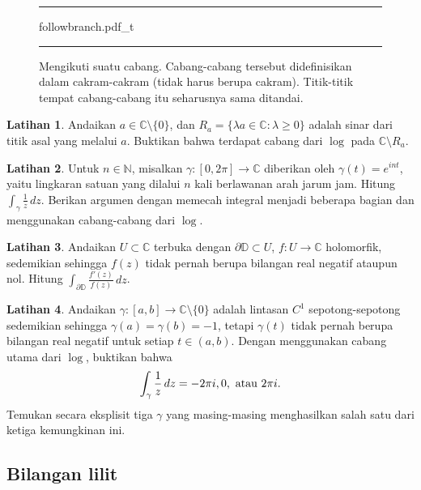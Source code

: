\documentclass[12pt,openany]{book}
\newcommand{\avoidbreak}{\postdisplaypenalty=100}
\newcommand{\C}{{\mathbb{C}}}
\newcommand{\N}{{\mathbb{N}}}
\newcommand{\D}{{\mathbb{D}}}
\theoremstyle{plain}
\theoremstyle{remark}
\theoremstyle{definition}
\newenvironment{exbox}{%
    \def\FrameCommand{\vrule width 1pt \relax\hspace{10pt}}%
    \MakeFramed{\advance\hsize-\width\FrameRestore}%
}{%
    \endMakeFramed
}
\newenvironment{myfig}{%
\begin{figure}[h!t]
\noindent\rule{\textwidth}{0.5pt}\vspace{12pt}\par\centering}%
{\par\noindent\rule{\textwidth}{0.5pt}
\end{figure}}
\theoremstyle{exercise}
\newtheorem{exercise}{Latihan}[section]
\theoremstyle{example}
\begin{document}
\begin{myfig}
{followbranch.pdf_t}
\caption{Mengikuti suatu cabang.
Cabang-cabang tersebut didefinisikan dalam cakram-cakram
(tidak harus berupa cakram).
Titik-titik tempat cabang-cabang itu seharusnya sama
ditandai.\label{fig:followbranch}}
\end{myfig}

\begin{exbox}
\begin{exercise}
Andaikan $a \in \C \setminus \{ 0 \}$, dan
$R_a = \{ \lambda a \in \C : \lambda \geq 0 \}$
adalah sinar dari titik asal yang melalui $a$.  Buktikan
bahwa terdapat cabang dari $\log$ pada $\C \setminus R_a$.
\end{exercise}

\begin{exercise}
Untuk $n \in \N$, misalkan $\gamma \colon [0,2\pi] \to \C$ diberikan oleh $\gamma(t) = e^{int}$,
yaitu lingkaran satuan yang dilalui $n$ kali berlawanan arah jarum jam.  Hitung
$\int_\gamma \frac{1}{z} \, dz$.  Berikan argumen dengan memecah integral
menjadi beberapa bagian dan menggunakan cabang-cabang dari $\log$.
\end{exercise}

\begin{exercise}
Andaikan
$U \subset \C$ terbuka dengan
$\partial \D \subset U$,
$f \colon U \to \C$ holomorfik,
sedemikian sehingga
$f(z)$ tidak pernah berupa bilangan real negatif ataupun nol.
Hitung
$\int_{\partial \D} \frac{f'(z)}{f(z)} \, dz$.
\end{exercise}

\begin{exercise}
Andaikan $\gamma \colon [a,b] \to \C \setminus \{ 0 \}$ adalah lintasan $C^1$ sepotong-sepotong
sedemikian sehingga $\gamma(a) = \gamma(b) = -1$, tetapi $\gamma(t)$ tidak pernah
berupa bilangan real negatif untuk setiap $t \in (a,b)$.  Dengan menggunakan cabang utama dari
$\log$, buktikan bahwa
\begin{equation*}
\int_\gamma \frac{1}{z} \, dz = -2\pi i, 0, \text{ atau } 2\pi i.
\avoidbreak
\end{equation*}
Temukan secara eksplisit
tiga $\gamma$ yang masing-masing menghasilkan salah satu dari ketiga kemungkinan ini.
\end{exercise}
\end{exbox}

\subsection{Bilangan lilit}
\end{document}
